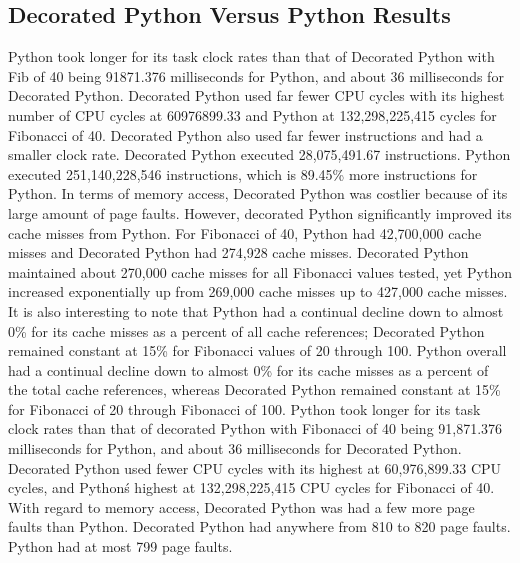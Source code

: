 \documentclass{sig-alternate}
\begin{document}
\subsection{Decorated Python Versus Python Results}
Python took longer for its task clock rates than that of Decorated Python with Fib of 40 being 91871.376 milliseconds for Python, and about 36 milliseconds for Decorated Python. Decorated Python used far fewer CPU cycles with its highest number of CPU cycles at 60976899.33 and Python at 132,298,225,415 cycles for Fibonacci of 40. Decorated Python also used far fewer instructions and had a smaller clock rate. Decorated Python executed 28,075,491.67 instructions. Python executed 251,140,228,546 instructions, which is 89.45\% more instructions for Python. In terms of memory access, Decorated Python was costlier because of its large amount of page faults. However, decorated Python significantly improved its cache misses from Python. For Fibonacci of 40, Python had 42,700,000 cache misses and Decorated Python had 274,928 cache misses. Decorated Python maintained about 270,000 cache misses for all Fibonacci values tested, yet Python increased exponentially up from 269,000 cache misses up to 427,000 cache misses. It is also interesting to note that Python had a continual decline down to almost 0\% for its cache misses as a percent of all cache references; Decorated Python remained constant at 15\% for Fibonacci values of 20 through 100. Python overall had a continual decline down to almost 0\% for its cache misses as a percent of the total cache references, whereas Decorated Python remained constant at 15\% for Fibonacci of 20 through Fibonacci of 100. Python took longer for its task clock rates than that of decorated Python with Fibonacci of 40 being 91,871.376 milliseconds for Python, and about 36 milliseconds for Decorated Python. Decorated Python used fewer CPU cycles with its highest at 60,976,899.33 CPU cycles, and Python\'s highest at 132,298,225,415 CPU cycles for Fibonacci of 40. With regard to memory access, Decorated Python was had a few more page faults than Python. Decorated Python had anywhere from 810 to 820 page faults. Python had at most 799 page faults.
\end{document}
